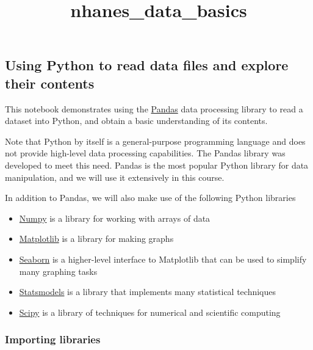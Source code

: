 \documentclass[11pt]{article}
\title{nhanes\_data\_basics}
\begin{document}
    
    
    \maketitle
    
    

    
    \hypertarget{using-python-to-read-data-files-and-explore-their-contents}{%
\subsection{Using Python to read data files and explore their
contents}\label{using-python-to-read-data-files-and-explore-their-contents}}

This notebook demonstrates using the
\href{http://pandas.pydata.org}{Pandas} data processing library to read
a dataset into Python, and obtain a basic understanding of its contents.

Note that Python by itself is a general-purpose programming language and
does not provide high-level data processing capabilities. The Pandas
library was developed to meet this need. Pandas is the most popular
Python library for data manipulation, and we will use it extensively in
this course.

In addition to Pandas, we will also make use of the following Python
libraries

\begin{itemize}
\item
  \href{http://www.numpy.org}{Numpy} is a library for working with
  arrays of data
\item
  \href{https://matplotlib.org}{Matplotlib} is a library for making
  graphs
\item
  \href{https://seaborn.pydata.org}{Seaborn} is a higher-level interface
  to Matplotlib that can be used to simplify many graphing tasks
\item
  \href{https://www.statsmodels.org/stable/index.html}{Statsmodels} is a
  library that implements many statistical techniques
\item
  \href{https://www.scipy.org}{Scipy} is a library of techniques for
  numerical and scientific computing
\end{itemize}

    \hypertarget{importing-libraries}{%
\subsubsection{Importing libraries}\label{importing-libraries}}
\end{document}
